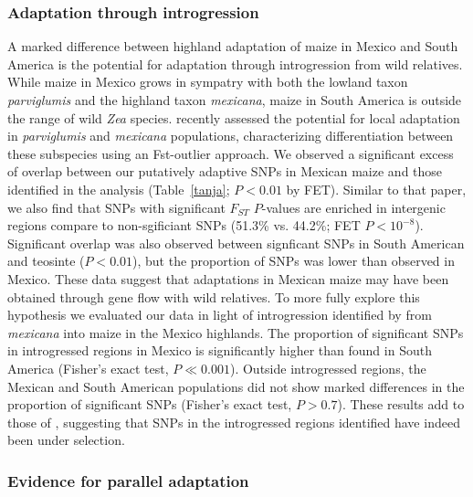 {{\subsubsection{Adaptation through introgression}

A marked difference between highland adaptation of maize in Mexico and South America is the potential for adaptation through introgression from wild relatives.  While maize in Mexico grows in sympatry with both the lowland taxon \emph{parviglumis} and the highland taxon \emph{mexicana}, maize in South America is outside the range of wild \emph{Zea} species.
 \cite{Pyhajarvi2013} recently assessed the potential for local adaptation in \emph{parviglumis} and \emph{mexicana} populations, characterizing differentiation between these subspecies using an Fst-outlier approach.
We observed a significant excess of overlap between our putatively adaptive SNPs in Mexican maize and those identified in the \cite{Pyhajarvi2013} analysis (Table~\ref{tanja}; $P<0.01$ by FET). Similar to that paper, we also find that SNPs with significant $F_{ST}$ $P$-values are enriched in intergenic regions compare to non-sgificiant SNPs (51.3\% vs. 44.2\%; FET $P < 10^{-8}$). Significant overlap was also observed between signficant SNPs in South American and teosinte ($P<0.01$), but the proportion of SNPs was lower than observed in Mexico.  These data suggest that adaptations in Mexican maize may have been obtained through gene flow with wild relatives.  To more fully explore this hypothesis we evaluated our data in light of introgression identified by \cite{Profford_2013} from \emph{mexicana} into maize in the Mexico highlands.  
The proportion of significant SNPs in introgressed regions in Mexico is significantly higher than found in South America (Fisher's exact test, $P\ll0.001$).
Outside introgressed regions, the Mexican and South American populations did not show marked differences in the proportion of significant SNPs (Fisher's exact test, $P>0.7$). These results add to those of \cite{Profford_2013}, suggesting that SNPs in the introgressed regions identified have indeed been under selection.  

\subsubsection{Evidence for parallel adaptation}

}}
